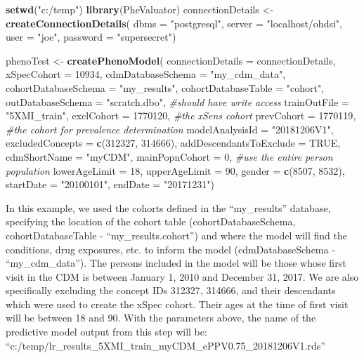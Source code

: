 \documentclass[11pt]{book}
\newenvironment{Shaded}{\begin{snugshade}}{\end{snugshade}}
\newcommand{\KeywordTok}[1]{\textcolor[rgb]{0.13,0.29,0.53}{\textbf{#1}}}
\newcommand{\DataTypeTok}[1]{\textcolor[rgb]{0.13,0.29,0.53}{#1}}
\newcommand{\DecValTok}[1]{\textcolor[rgb]{0.00,0.00,0.81}{#1}}
\newcommand{\StringTok}[1]{\textcolor[rgb]{0.31,0.60,0.02}{#1}}
\newcommand{\CommentTok}[1]{\textcolor[rgb]{0.56,0.35,0.01}{\textit{#1}}}
\newcommand{\OtherTok}[1]{\textcolor[rgb]{0.56,0.35,0.01}{#1}}
\newcommand{\NormalTok}[1]{#1}
\theoremstyle{definition}
\theoremstyle{definition}
\theoremstyle{definition}
\theoremstyle{remark}
\begin{document}
\begin{Shaded}
\begin{Highlighting}[]
\KeywordTok{setwd}\NormalTok{(}\StringTok{"c:/temp"}\NormalTok{)}
\KeywordTok{library}\NormalTok{(PheValuator)}
\NormalTok{connectionDetails <-}\StringTok{ }\KeywordTok{createConnectionDetails}\NormalTok{(}
  \DataTypeTok{dbms =} \StringTok{"postgresql"}\NormalTok{,}
  \DataTypeTok{server =} \StringTok{"localhost/ohdsi"}\NormalTok{,}
  \DataTypeTok{user =} \StringTok{"joe"}\NormalTok{,}
  \DataTypeTok{password =} \StringTok{"supersecret"}\NormalTok{)}

\NormalTok{phenoTest <-}\StringTok{ }\KeywordTok{createPhenoModel}\NormalTok{(}
  \DataTypeTok{connectionDetails =}\NormalTok{ connectionDetails,}
  \DataTypeTok{xSpecCohort =} \DecValTok{10934}\NormalTok{,}
  \DataTypeTok{cdmDatabaseSchema =} \StringTok{"my_cdm_data"}\NormalTok{,}
  \DataTypeTok{cohortDatabaseSchema =} \StringTok{"my_results"}\NormalTok{,}
  \DataTypeTok{cohortDatabaseTable =} \StringTok{"cohort"}\NormalTok{,}
  \DataTypeTok{outDatabaseSchema =} \StringTok{"scratch.dbo"}\NormalTok{, }\CommentTok{#should have write access}
  \DataTypeTok{trainOutFile =} \StringTok{"5XMI_train"}\NormalTok{,}
  \DataTypeTok{exclCohort =} \DecValTok{1770120}\NormalTok{, }\CommentTok{#the xSens cohort}
  \DataTypeTok{prevCohort =} \DecValTok{1770119}\NormalTok{, }\CommentTok{#the cohort for prevalence determination}
  \DataTypeTok{modelAnalysisId =} \StringTok{"20181206V1"}\NormalTok{,}
  \DataTypeTok{excludedConcepts =} \KeywordTok{c}\NormalTok{(}\DecValTok{312327}\NormalTok{, }\DecValTok{314666}\NormalTok{),}
  \DataTypeTok{addDescendantsToExclude =} \OtherTok{TRUE}\NormalTok{,}
  \DataTypeTok{cdmShortName =} \StringTok{"myCDM"}\NormalTok{,}
  \DataTypeTok{mainPopnCohort =} \DecValTok{0}\NormalTok{, }\CommentTok{#use the entire person population}
  \DataTypeTok{lowerAgeLimit =} \DecValTok{18}\NormalTok{,}
  \DataTypeTok{upperAgeLimit =} \DecValTok{90}\NormalTok{,}
  \DataTypeTok{gender =} \KeywordTok{c}\NormalTok{(}\DecValTok{8507}\NormalTok{, }\DecValTok{8532}\NormalTok{),}
  \DataTypeTok{startDate =} \StringTok{"20100101"}\NormalTok{,}
  \DataTypeTok{endDate =} \StringTok{"20171231"}\NormalTok{)}
\end{Highlighting}
\end{Shaded}

In this example, we used the cohorts defined in the ``my\_results''
database, specifying the location of the cohort table
(cohortDatabaseSchema, cohortDatabaseTable - ``my\_results.cohort'') and
where the model will find the conditions, drug exposures, etc. to inform
the model (cdmDatabaseSchema - ``my\_cdm\_data''). The persons included
in the model will be those whose first visit in the CDM is between
January 1, 2010 and December 31, 2017. We are also specifically
excluding the concept IDs 312327, 314666, and their descendants which
were used to create the xSpec cohort. Their ages at the time of first
visit will be between 18 and 90. With the parameters above, the name of
the predictive model output from this step will be:
``c:/temp/lr\_results\_5XMI\_train\_myCDM\_ePPV0.75\_20181206V1.rds''
\end{document}

